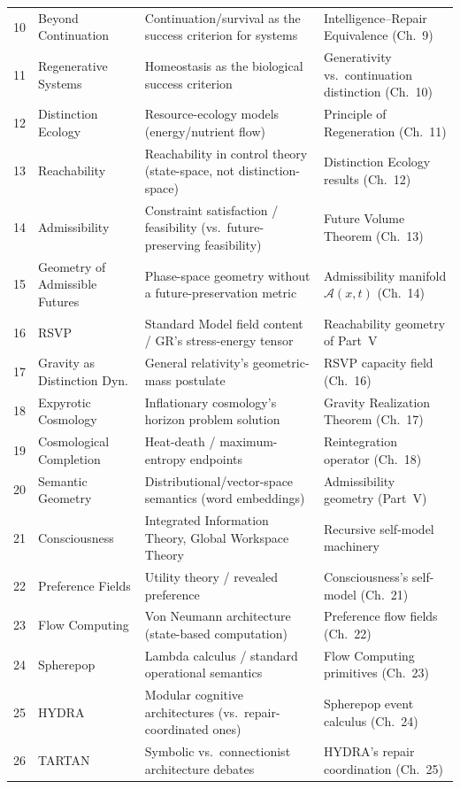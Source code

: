 \documentclass[11pt]{report}
\newcommand{\adm}{\mathcal{A}}
\begin{document}
\begin{longtable}{@{}p{0.4cm}p{3.6cm}p{5.6cm}p{5.6cm}@{}}
10 & Beyond Continuation & Continuation/survival as the success criterion for systems & Intelligence--Repair Equivalence (Ch.~9) \\
11 & Regenerative Systems & Homeostasis as the biological success criterion & Generativity vs.\ continuation distinction (Ch.~10) \\
12 & Distinction Ecology & Resource-ecology models (energy/nutrient flow) & Principle of Regeneration (Ch.~11) \\
13 & Reachability & Reachability in control theory (state-space, not distinction-space) & Distinction Ecology results (Ch.~12) \\
14 & Admissibility & Constraint satisfaction / feasibility (vs.\ future-preserving feasibility) & Future Volume Theorem (Ch.~13) \\
15 & Geometry of Admissible Futures & Phase-space geometry without a future-preservation metric & Admissibility manifold $\adm(x,t)$ (Ch.~14) \\
16 & RSVP & Standard Model field content / GR's stress-energy tensor & Reachability geometry of Part~V \\
17 & Gravity as Distinction Dyn. & General relativity's geometric-mass postulate & RSVP capacity field (Ch.~16) \\
18 & Expyrotic Cosmology & Inflationary cosmology's horizon problem solution & Gravity Realization Theorem (Ch.~17) \\
19 & Cosmological Completion & Heat-death / maximum-entropy endpoints & Reintegration operator (Ch.~18) \\
20 & Semantic Geometry & Distributional/vector-space semantics (word embeddings) & Admissibility geometry (Part~V) \\
21 & Consciousness & Integrated Information Theory, Global Workspace Theory & Recursive self-model machinery \\
22 & Preference Fields & Utility theory / revealed preference & Consciousness's self-model (Ch.~21) \\
23 & Flow Computing & Von Neumann architecture (state-based computation) & Preference flow fields (Ch.~22) \\
24 & Spherepop & Lambda calculus / standard operational semantics & Flow Computing primitives (Ch.~23) \\
25 & HYDRA & Modular cognitive architectures (vs.\ repair-coordinated ones) & Spherepop event calculus (Ch.~24) \\
26 & TARTAN & Symbolic vs.\ connectionist architecture debates & HYDRA's repair coordination (Ch.~25) \\

\end{longtable}
\end{document}

